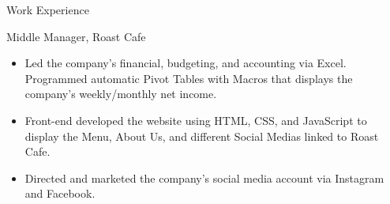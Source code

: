 \documentclass{article}
\newlength{\tabin}
\newlength{\secsep}
\newcommand{\lineunder}{\vspace*{-8pt} \\ \hspace*{-6pt} \hrulefill \\ \vspace*{-15pt}}
\newenvironment{tabbedsection}[1]{
  \begin{list}{}{
      \setlength{\itemsep}{0pt}
      \setlength{\labelsep}{0pt}
      \setlength{\labelwidth}{0pt}
      \setlength{\leftmargin}{\tabin}
      \setlength{\rightmargin}{\tabin}
      \setlength{\listparindent}{0pt}
      \setlength{\parsep}{0pt}
      \setlength{\parskip}{0pt}
      \setlength{\partopsep}{0pt}
      \setlength{\topsep}{#1}
    }
  \item[]
}{\end{list}}
\newenvironment{resume_section}[1]{
  \filbreak
  \vspace{2\secsep}
  \textsc{\large#1}
  \lineunder
  \begin{tabbedsection}{\secsep}
}{\end{tabbedsection}}
\newenvironment{resume_subsection}[2][]{
  \textbf{#2} \hfill {\footnotesize #1} \hspace{2em}
  \begin{tabbedsection}{0.5\secsep}
}{\end{tabbedsection}}
\newenvironment{subitems}{
  \renewcommand{\labelitemi}{-}
  \begin{itemize}
      \setlength{\labelsep}{1em}
}{\end{itemize}}
\begin{document}
\begin{resume_section}{Work Experience}
  \begin{resume_subsection}{Middle Manager, Roast Cafe}
  \begin{subitems}
  \item Led the company's financial, budgeting, and accounting via Excel. Programmed automatic Pivot Tables with Macros that displays the company's weekly/monthly net income.
  \item Front-end developed the website using HTML, CSS, and JavaScript to display the Menu, About Us, and different Social Medias linked to Roast Cafe.
  \item Directed and marketed the company's social media account via Instagram and Facebook.
  \end{subitems}
      
  \end{resume_subsection}
\end{resume_section}
\end{document}
